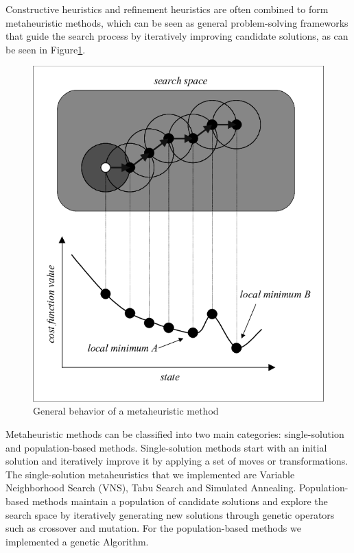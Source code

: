 
Constructive heuristics and refinement heuristics  are often combined to form metaheuristic methods, which can be seen as general problem-solving frameworks that guide the search process by iteratively improving candidate solutions, as can be seen in Figure\ref{fig:metaheur}.

\begin{figure}[!h]
    \centering
    \includegraphics[]{images/metaheuristics.png}
    \caption{General behavior of a metaheuristic method}
    \label{fig:metaheur}
\end{figure}

Metaheuristic methods can be classified into two main categories: single-solution and population-based methods. Single-solution methods start with an initial solution and iteratively improve it by applying a set of moves or transformations. The single-solution metaheuristics that we implemented are Variable Neighborhood Search (VNS), Tabu Search and Simulated Annealing. Population-based methods maintain a population of candidate solutions and explore the search space by iteratively generating new solutions through genetic operators such as crossover and mutation. For the population-based methods we implemented a genetic Algorithm.





